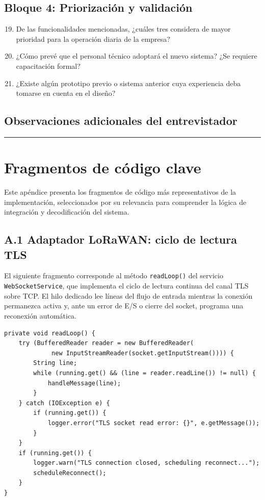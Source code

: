 \documentclass[12pt,a4paper,oneside]{report}
\begin{document}
\section*{Bloque 4: Priorización y validación}

\begin{enumerate}
  \setcounter{enumi}{18}
  \item De las funcionalidades mencionadas, ¿cuáles tres considera de mayor prioridad para la operación diaria de la empresa?
  \item ¿Cómo prevé que el personal técnico adoptará el nuevo sistema? ¿Se requiere capacitación formal?
  \item ¿Existe algún prototipo previo o sistema anterior cuya experiencia deba tomarse en cuenta en el diseño?
\end{enumerate}

\section*{Observaciones adicionales del entrevistador}

\vspace{3cm}

\noindent\rule{\textwidth}{0.4pt}

\chapter{Fragmentos de código clave}
\label{apendice:codigo}

Este apéndice presenta los fragmentos de código más representativos de la implementación, seleccionados por su relevancia para comprender la lógica de integración y decodificación del sistema.

\section*{A.1 Adaptador LoRaWAN: ciclo de lectura TLS}

El siguiente fragmento corresponde al método \texttt{readLoop()} del servicio \texttt{WebSocketService}, que implementa el ciclo de lectura continua del canal TLS sobre TCP. El hilo dedicado lee líneas del flujo de entrada mientras la conexión permanezca activa y, ante un error de E/S o cierre del socket, programa una reconexión automática.

\begin{verbatim}
private void readLoop() {
    try (BufferedReader reader = new BufferedReader(
             new InputStreamReader(socket.getInputStream()))) {
        String line;
        while (running.get() && (line = reader.readLine()) != null) {
            handleMessage(line);
        }
    } catch (IOException e) {
        if (running.get()) {
            logger.error("TLS socket read error: {}", e.getMessage());
        }
    }
    if (running.get()) {
        logger.warn("TLS connection closed, scheduling reconnect...");
        scheduleReconnect();
    }
}
\end{verbatim}
\end{document}
